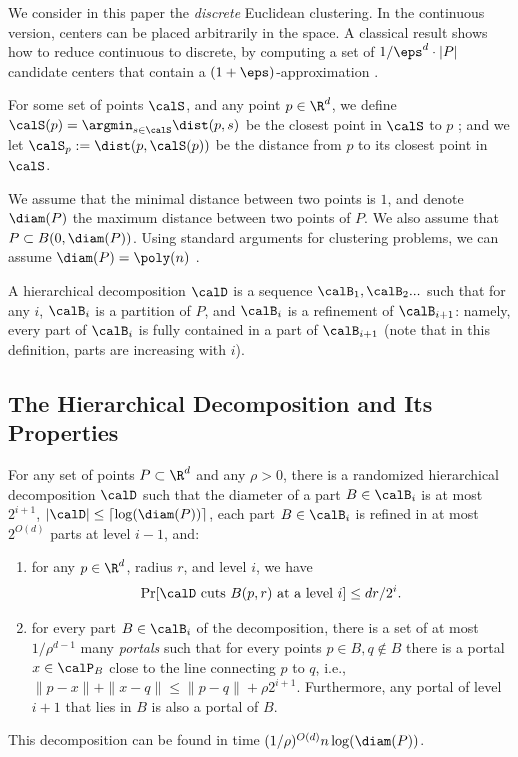 \begin{remark}\label{rem:cont}
    We consider in this paper the \emph{discrete} Euclidean clustering. In the continuous version, centers can be placed arbitrarily in the space. A classical result shows how to reduce continuous to discrete, by computing a set of $1/\eps^d \cdot |P|$ candidate centers that contain a $(1+\eps)$-approximation \cite{Matousek00}.
\end{remark}


For some set of points $\calS$, and any point $p \in \R^d$, we define $\calS(p) = \argmin_{s \in \calS} \dist(p, s)$ be the closest point in $\calS$ to $p$ ; and we let $\calS_p :=\dist(p, \calS(p) )$ be the distance from $p$ to its closest point in $\calS$.

We assume that the minimal distance between two points is $1$, and denote $\diam(P)$ the maximum distance between two points of $P$. We also assume that $P \subset B(0, \diam(P))$. Using standard arguments for clustering problems, we can assume $\diam(P) = \poly(n)$ \cite{CohenAddadFS19}.

A hierarchical decomposition $\calD$ is a sequence $\calB_1, \calB_2 ...$ such that for any $i$, $\calB_i$ is a partition of $P$, and $\calB_i$ is a refinement of $\calB_{i+1}$: namely, every part of $\calB_i$ is fully contained in a part of $\calB_{i+1}$ (note that in this definition, parts are increasing with $i$).

\subsection{The Hierarchical Decomposition and Its Properties}



\begin{lemma}\label{lem:talwar-decomp}
For any set of points $P \subset \R^d$ and any $\rho > 0$, 
there is a randomized hierarchical 
decomposition $\calD$ such that the diameter of a part $B \in \calB_i$ is at most
$2^{i+1}$, $|\calD|\leq\lceil\log(\diam(P))\rceil$, each part $B \in \calB_i$ is refined in at most $2^{O(d)}$ parts at level $i-1$, and:

\begin{enumerate}

  \item\label{prop:doub:prob} for any $p \in \R^d$, %
radius $r$, and level $i$, we have 
    \[\Pr[\calD \text{ cuts } B(p,r) \text{ at a level } i] \leq  dr/2^i.\]

 \item\label{prop:doub:portals} for every part $B\in \calB_i$ of the decomposition, there is a set of at most $ 1/\rho^{d-1}$ many 
    \emph{portals} such that for every points $p \in B, q \notin B$ there is a portal $x\in\calP_B$ close to the line connecting $p$ to $q$, i.e., 
$\|p-x\| + \|x-q\| \leq \|p-q\| + \rho 2^{i+1}$.
Furthermore, any portal of level $i+1$ that lies in $B$ is also a 
portal of $B$.
    \end{enumerate}
This decomposition can be found in time $(1/\rho)^{O(d)} n \log (\diam(P))$.
\end{lemma}


